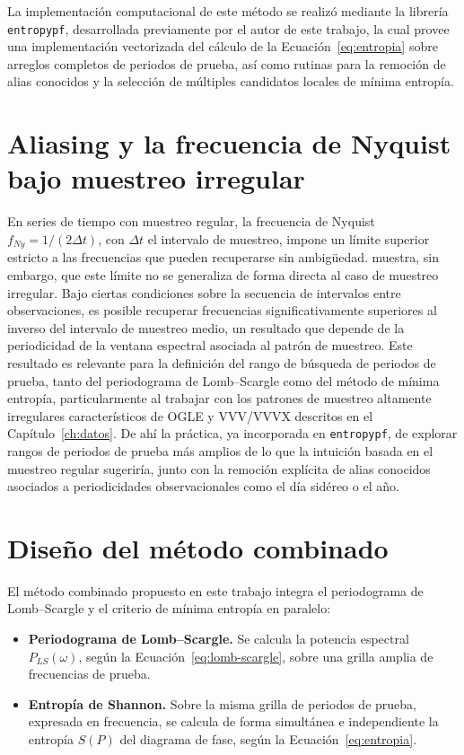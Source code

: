 \documentclass[12pt,letterpaper,oneside]{book}
\begin{document}
La implementaci\'on computacional de este m\'etodo se realiz\'o mediante la librer\'ia \texttt{entropypf}, desarrollada previamente por el autor de este trabajo, la cual provee una implementaci\'on vectorizada del c\'alculo de la Ecuaci\'on~\eqref{eq:entropia} sobre arreglos completos de periodos de prueba, as\'i como rutinas para la remoci\'on de alias conocidos y la selecci\'on de m\'ultiples candidatos locales de m\'inima entrop\'ia.

\section{Aliasing y la frecuencia de Nyquist bajo muestreo irregular}
\label{sec:nyquist}

En series de tiempo con muestreo regular, la frecuencia de Nyquist $f_{Ny} = 1/(2\Delta t)$, con $\Delta t$ el intervalo de muestreo, impone un l\'imite superior estricto a las frecuencias que pueden recuperarse sin ambig\"uedad. \citet{Mignard2005} muestra, sin embargo, que este l\'imite no se generaliza de forma directa al caso de muestreo irregular. Bajo ciertas condiciones sobre la secuencia de intervalos entre observaciones, es posible recuperar frecuencias significativamente superiores al inverso del intervalo de muestreo medio, un resultado que depende de la periodicidad de la ventana espectral asociada al patr\'on de muestreo. Este resultado es relevante para la definici\'on del rango de b\'usqueda de periodos de prueba, tanto del periodograma de Lomb--Scargle como del m\'etodo de m\'inima entrop\'ia, particularmente al trabajar con los patrones de muestreo altamente irregulares caracter\'isticos de OGLE y VVV/VVVX descritos en el Cap\'itulo~\ref{ch:datos}. De ah\'i la pr\'actica, ya incorporada en \texttt{entropypf}, de explorar rangos de periodos de prueba m\'as amplios de lo que la intuici\'on basada en el muestreo regular sugerir\'ia, junto con la remoci\'on expl\'icita de alias conocidos asociados a periodicidades observacionales como el d\'ia sid\'ereo o el a\~no.

\section{Dise\~no del m\'etodo combinado}
\label{sec:metodo-combinado}

El m\'etodo combinado propuesto en este trabajo integra el periodograma de Lomb--Scargle y el criterio de m\'inima entrop\'ia en paralelo:

\begin{itemize}
	\item \textbf{Periodograma de Lomb--Scargle.} Se calcula la potencia espectral $P_{LS}(\omega)$, seg\'un la Ecuaci\'on~\eqref{eq:lomb-scargle}, sobre una grilla amplia de frecuencias de prueba.
	\item \textbf{Entrop\'ia de Shannon.} Sobre la misma grilla de periodos de prueba, expresada en frecuencia, se calcula de forma simult\'anea e independiente la entrop\'ia $S(P)$ del diagrama de fase, seg\'un la Ecuaci\'on~\eqref{eq:entropia}.
\end{itemize}
\end{document}
